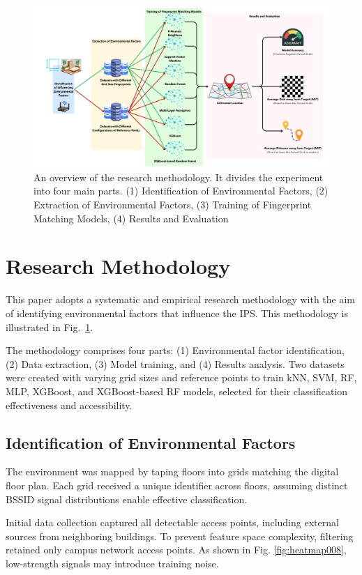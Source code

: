 \documentclass[runningheads]{llncs}
\begin{document}
\begin{figure}
	\includegraphics[width=\textwidth]{meth1.png}
	\caption{An overview of the research methodology. It divides the experiment into four main parts. (1) Identification of Environmental Factors, (2) Extraction of Environmental Factors, (3) Training of Fingerprint Matching Models, (4) Results and Evaluation}
	\label{fig:graph_step}
\end{figure}

\section{Research Methodology}
This paper adopts a systematic and empirical research methodology with the aim of identifying environmental factors that influence the IPS. This methodology is illustrated in Fig.~\ref{fig:graph_step}.

The methodology comprises four parts: (1) Environmental factor identification, (2) Data extraction, (3) Model training, and (4) Results analysis. Two datasets were created with varying grid sizes and reference points to train kNN, SVM, RF, MLP, XGBoost, and XGBoost-based RF models, selected for their classification effectiveness and accessibility.

\subsection{Identification of Environmental Factors}
The environment was mapped by taping floors into grids matching the digital floor plan. Each grid received a unique identifier across floors, assuming distinct BSSID signal distributions enable effective classification.

Initial data collection captured all detectable access points, including external sources from neighboring buildings. To prevent feature space complexity, filtering retained only campus network access points. As shown in Fig. \ref{fig:heatmap008}, low-strength signals may introduce training noise.
\end{document}
